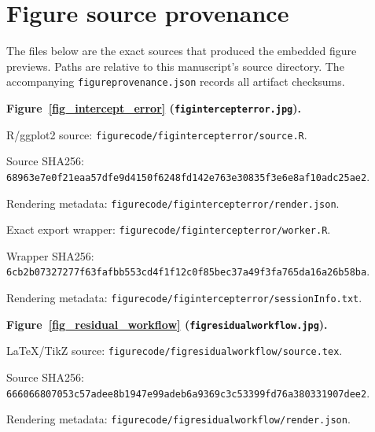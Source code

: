 \documentclass[11pt]{article}
\begin{document}



\clearpage
\section*{Figure source provenance}
The files below are the exact sources that produced the embedded figure previews. Paths are relative to this manuscript's source directory. The accompanying \texttt{figureprovenance.json} records all artifact checksums.\par
\medskip\noindent\textbf{Figure~\ref{fig_intercept_error} (\texttt{figintercepterror.jpg}).}\par
\noindent R/ggplot2 source: \texttt{figurecode/\allowbreak{}figintercepterror/\allowbreak{}source.R}.\par
\noindent Source SHA256: \texttt{68963e7e\allowbreak{}0f21eaa5\allowbreak{}7dfe9d41\allowbreak{}50f6248f\allowbreak{}d142e763\allowbreak{}e30835f3\allowbreak{}e6e8af10\allowbreak{}adc25ae2}.\par
\noindent Rendering metadata: \texttt{figurecode/\allowbreak{}figintercepterror/\allowbreak{}render.json}.\par
\noindent Exact export wrapper: \texttt{figurecode/\allowbreak{}figintercepterror/\allowbreak{}worker.R}.\par
\noindent Wrapper SHA256: \texttt{6cb2b073\allowbreak{}27277f63\allowbreak{}fafbb553\allowbreak{}cd4f1f12\allowbreak{}c0f85bec\allowbreak{}37a49f3f\allowbreak{}a765da16\allowbreak{}a26b58ba}.\par
\noindent Rendering metadata: \texttt{figurecode/\allowbreak{}figintercepterror/\allowbreak{}sessionInfo.txt}.\par
\medskip\noindent\textbf{Figure~\ref{fig_residual_workflow} (\texttt{figresidualworkflow.jpg}).}\par
\noindent LaTeX/TikZ source: \texttt{figurecode/\allowbreak{}figresidualworkflow/\allowbreak{}source.tex}.\par
\noindent Source SHA256: \texttt{66606680\allowbreak{}7053c57a\allowbreak{}dee8b194\allowbreak{}7e99adeb\allowbreak{}6a9369c3\allowbreak{}c53399fd\allowbreak{}76a38033\allowbreak{}1907dee2}.\par
\noindent Rendering metadata: \texttt{figurecode/\allowbreak{}figresidualworkflow/\allowbreak{}render.json}.\par
\end{document}
